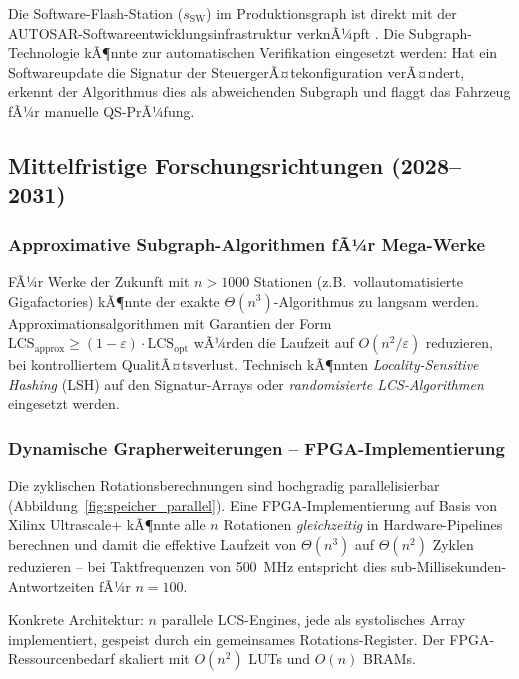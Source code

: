 ﻿\documentclass[a4paper,12pt]{article}
\theoremstyle{definition}
\begin{document}
Die Software-Flash-Station ($s_{\mathrm{SW}}$) im Produktionsgraph ist direkt mit der
AUTOSAR-Softwareentwicklungsinfrastruktur verknÃ¼pft \cite{autosar2023}. Die Subgraph-Technologie
kÃ¶nnte zur automatischen Verifikation eingesetzt werden: Hat ein Softwareupdate die
Signatur der SteuergerÃ¤tekonfiguration verÃ¤ndert, erkennt der Algorithmus dies als
abweichenden Subgraph und flaggt das Fahrzeug fÃ¼r manuelle QS-PrÃ¼fung.

\subsection{Mittelfristige Forschungsrichtungen (2028--2031)}

\subsubsection{Approximative Subgraph-Algorithmen fÃ¼r Mega-Werke}

FÃ¼r Werke der Zukunft mit $n > 1000$ Stationen (z.B.\ vollautomatisierte Gigafactories)
kÃ¶nnte der exakte $\Theta(n^3)$-Algorithmus zu langsam werden. Approximationsalgorithmen
mit Garantien der Form $\mathrm{LCS}_{\text{approx}} \geq (1-\varepsilon) \cdot \mathrm{LCS}_{\text{opt}}$
wÃ¼rden die Laufzeit auf $O(n^2 / \varepsilon)$ reduzieren, bei kontrolliertem QualitÃ¤tsverlust.
Technisch kÃ¶nnten \emph{Locality-Sensitive Hashing} (LSH) auf den Signatur-Arrays oder
\emph{randomisierte LCS-Algorithmen} \cite{charikar2004approximate} eingesetzt werden.

\subsubsection{Dynamische Grapherweiterungen -- FPGA-Implementierung}

Die zyklischen Rotationsberechnungen sind hochgradig parallelisierbar (Abbildung~\ref{fig:speicher_parallel}).
Eine FPGA-Implementierung auf Basis von Xilinx Ultrascale+ \cite{xilinx_ultrascale} kÃ¶nnte
alle $n$ Rotationen \emph{gleichzeitig} in Hardware-Pipelines berechnen und damit die
effektive Laufzeit von $\Theta(n^3)$ auf $\Theta(n^2)$ Zyklen reduzieren -- bei
Taktfrequenzen von 500~MHz entspricht dies sub-Millisekunden-Antwortzeiten fÃ¼r $n=100$.

Konkrete Architektur: $n$ parallele LCS-Engines, jede als systolisches Array implementiert,
gespeist durch ein gemeinsames Rotations-Register. Der FPGA-Ressourcenbedarf skaliert mit
$O(n^2)$ LUTs und $O(n)$ BRAMs.
\end{document}
